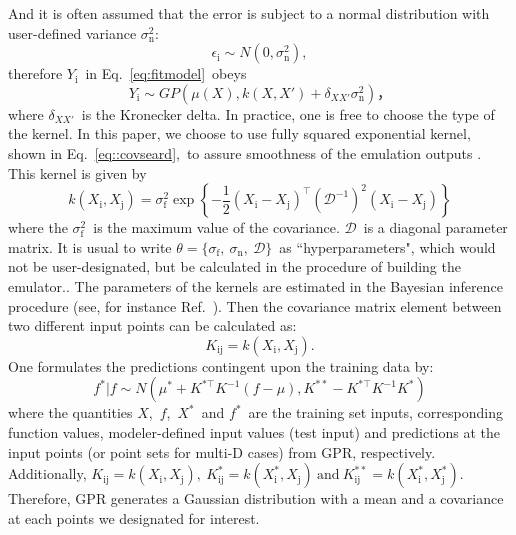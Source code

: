 \documentclass[review]{elsarticle}
\newcommand{\tcb}[1]{{#1}}
\begin{document}
And it is often assumed that
the error is subject to a normal distribution with user-defined variance $\sigma_\mathrm{n}^2$:
\begin{equation}
\epsilon_\mathrm{i}\sim N(0,\sigma_\mathrm{n}^2),
\end{equation}
therefore $Y_\mathrm{i}$~in Eq.~\eqref{eq:fitmodel}~obeys
\begin{equation}
Y_\mathrm{i}\sim GP(\mu(X),k(X,X')+\delta_{XX'}\sigma_\mathrm{n}^2)，
\end{equation}
where $\delta_{XX'}$~is the Kronecker delta.
In practice, one is free to choose the type of the kernel. In this paper, we choose to use fully squared exponential kernel, shown in Eq.~\eqref{eq::covseard},~to assure smoothness of the emulation outputs \cite{pie}. This kernel is given by
\begin{equation}\label{eq::covseard}
k(X_\mathrm{i},X_\mathrm{j})=\sigma_\mathrm{f}^2\exp\left\{-\frac{1}{2}\left(X_\mathrm{i}-X_\mathrm{j}\right)^\top\left(\mathcal{D}^{-1}\right)^2\left(X_\mathrm{i}-X_\mathrm{j}\right)\right\}
\end{equation}
where the $\sigma_\mathrm{f}^2$~is the maximum value of the covariance. $\mathcal{D}$~is a diagonal parameter matrix. {It is usual to write $\theta=\{\sigma_\mathrm{f},~\sigma_\mathrm{n},~\mathcal{D}\}$~as ``hyperparameters", which would not be user-designated, but be calculated in the procedure of building the emulator\cite{carl}.}.
The parameters of the kernels are estimated in the Bayesian inference procedure (see, for instance Ref.~\cite{carl}).
Then the covariance matrix element between two different input points can be calculated as:
\begin{equation}
K_{\mathrm{ij}}=k(X_\mathrm{i},X_\mathrm{j}).
\end{equation}
One formulates the predictions contingent upon the training data by:
\begin{equation}\label{mark}
f^*|f\sim N(\mu^*+K^{*\top} K^{-1}(f-\mu),K^{**}-K^{*\top} K^{-1}K^*)
\end{equation}
where \tcb{the quantities $X$,~$f$,~$X^*$~and $f^*$~are the training set inputs, corresponding function values, modeler-defined input values (test input) and predictions at the input points (or point sets for multi-D cases) from GPR, respectively.  Additionally,} $K_{\mathrm{ij}}=k(X_\mathrm{i},X_\mathrm{j}),~K^*_{\mathrm{ij}}=k(X^*_\mathrm{i},X_\mathrm{j})~\mathrm{and}~K^{**}_{\mathrm{ij}}=k(X^*_\mathrm{i},X^*_\mathrm{j})$. Therefore, GPR generates a Gaussian distribution with a mean and a covariance at each points we designated for interest.
\end{document}
